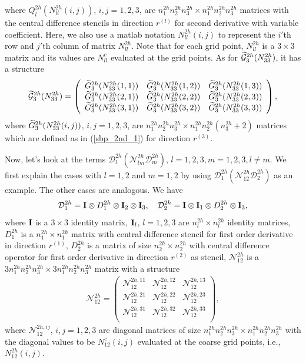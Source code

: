 where $Q_l^{2h}(N_{ll}^{2h}(i,j))$, $i,j = 1,2,3$, are $n_1^{2h}n_2^{2h}n_3^{2h}\times n_1^{2h}n_2^{2h}n_3^{2h}$ matrices with the central difference stencils in direction $r^{(l)}$ for second derivative with variable coefficient. Here, we also use a matlab notation $N_{ll}^{2h}(i,j)$ to represent the $i'$th row and $j'$th column of matrix $N_{ll}^{2h}$. Note that for each grid point, $N_{ll}^{2h}$ is a $3\times3$ matrix and its values are $N_{ll}^c$ evaluated at the grid points. As for $\widetilde{\mathcal{G}}_3^{2h}({N}_{33}^{2h})$, it has a structure
\[ \widetilde{\mathcal{G}}^{2h}_3({N}_{33}^{2h}) = \left(\begin{array}{ccc}
\widetilde{G}_3^{2h}(N_{33}^{2h}(1,1)) & \widetilde{G}_3^{2h}(N_{33}^{2h}(1,2))  & \widetilde{G}_3^{2h}(N_{33}^{2h}(1,3)) \\
\widetilde{G}_3^{2h}(N_{33}^{2h}(2,1)) & \widetilde{G}_3^{2h}(N_{33}^{2h}(2,2))  & \widetilde{G}_3^{2h}(N_{33}^{2h}(2,3)) \\
\widetilde{G}_3^{2h}(N_{33}^{2h}(3,1)) & \widetilde{G}_3^{2h}(N_{33}^{2h}(3,2))  & \widetilde{G}_3^{2h}(N_{33}^{2h}(3,3)) \end{array}\right),\]
where $\widetilde{G}_3^{2h}(N_{33}^{2h}(i,j))$, $i,j = 1,2,3$, are $n_1^{2h}n_2^{2h}n_3^{2h}\times n_1^{2h}n_2^{2h}(n_3^{2h}+2)$ matrices which are defined as in (\ref{sbp_2nd_1}) for direction $r^{(3)}$. 

Now, let's look at the terms $\mathcal{D}_l^{2h}(\mathcal{N}_{lm}^{2h}\mathcal{D}_m^{2h})$, $l = 1,2,3, m = 1,2,3, l\neq m$. We first explain the cases with $l = 1,2$ and $m = 1,2$ by using $\mathcal{D}_1^{2h}(\mathcal{N}_{12}^{2h}\mathcal{D}_2^{2h})$ as an example. The other cases are analogous. We have 
\begin{equation}\label{D12}
\mathcal{D}_1^{2h} = {\bf I}\otimes D_1^{2h} \otimes {\bf I}_2 \otimes {\bf I}_3,\ \ \ \mathcal{D}_2^{2h} ={\bf I}\otimes {\bf I}_1\otimes D_2^{2h}\otimes {\bf I}_3,
\end{equation}
where ${\bf I}$ is a $3\times3$ identity matrix, ${\bf I}_l$, $l = 1,2,3$ are $n_l^{2h}\times n_l^{2h}$ identity matrices, $D_1^{2h}$ is a $n_1^{2h}\times n_1^{2h}$ matrix with central difference stencil for first order derivative in direction $r^{(1)}$, $D_2^{2h}$ is a matrix of size $n_2^{2h}\times n_2^{2h}$ with central difference operator for first order derivative in direction $r^{(2)}$ as stencil, $\mathcal{N}_{12}^{2h}$ is a $3n_1^{2h}n_2^{2h}n_3^{2h}\times3n_1^{2h}n_2^{2h}n_3^{2h}$ matrix with a structure
\begin{align}\label{N12}
\mathcal{N}_{12}^{2h}= \left(\begin{array}{ccc}
\mathscr{N}_{12}^{2h,11}&\mathscr{N}_{12}^{2h,12}& \mathscr{N}_{12}^{2h,13}\\
\mathscr{N}_{12}^{2h,21} & \mathscr{N}_{12}^{2h,22} & \mathscr{N}_{12}^{2h,23} \\
\mathscr{N}_{12}^{2h,31}&\mathscr{N}_{12}^{2h,32}&  \mathscr{N}_{12}^{2h,33}\\ \end{array}\right),
\end{align}
where $\mathscr{N}_{12}^{2h,ij}$, $i,j = 1,2,3$ are diagonal matrices of size $n_1^{2h}n_2^{2h}n_3^{2h}\times n_1^{2h}n_2^{2h}n_3^{2h}$ with the diagonal values to be $N_{12}^{c}(i,j)$ evaluated at the coarse grid points, i.e., $N_{12}^{2h}(i,j)$. 

